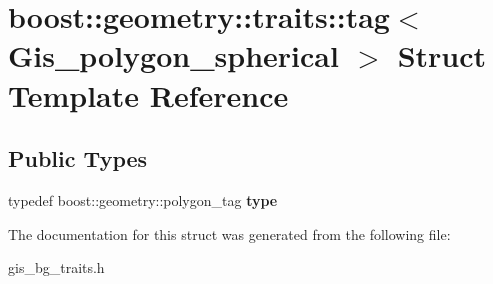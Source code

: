 \hypertarget{structboost_1_1geometry_1_1traits_1_1tag_3_01Gis__polygon__spherical_01_4}{}\section{boost\+:\+:geometry\+:\+:traits\+:\+:tag$<$ Gis\+\_\+polygon\+\_\+spherical $>$ Struct Template Reference}
\label{structboost_1_1geometry_1_1traits_1_1tag_3_01Gis__polygon__spherical_01_4}
\subsection*{Public Types}
\begin{DoxyCompactItemize}
\item 
\mbox{\label{structboost_1_1geometry_1_1traits_1_1tag_3_01Gis__polygon__spherical_01_4_a50b3936b35e1a4db79944903c0b31a07}} 
typedef boost\+::geometry\+::polygon\+\_\+tag {\bfseries type}
\end{DoxyCompactItemize}


The documentation for this struct was generated from the following file\+:\begin{DoxyCompactItemize}
\item 
gis\+\_\+bg\+\_\+traits.\+h\end{DoxyCompactItemize}

